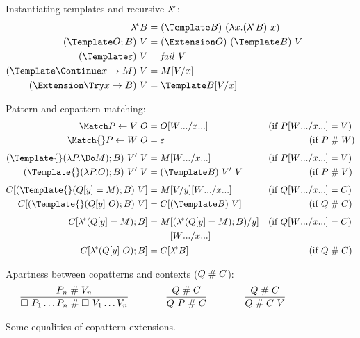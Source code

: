 \documentclass[runningheads]{llncs}
\begin{document}
\begin{figure}
Instantiating templates and recursive $\lambda^{\!*}$:
\begin{align*}
  \lamstar B
  &=
  (\Template B) ~ (\lambda x. (\lamstar B) ~ x)
  \\
  (\Template O; B) ~ V
  &=
  (\Extension O) ~ (\Template B) ~ V
  \\
  (\Template \varepsilon) ~ V
  &=
  \mathit{fail}~V
  \\
  (\Template \Continue x \to M) ~ V
  &=
  M\subst{x}{V}
  \\
  (\Extension \Try x \to B) ~ V
  &=
  \Template B\subst{x}{V}
\end{align*}

Pattern and copattern matching:
\begin{align*}
  \Match P \gets V ~ O
  &=
  O\subst{\many{x}}{\many{W}}
  &(\text{if } P\subst{\many{x}}{\many{W}} &= V)
  \\
  \Match{} P \gets W ~ O
  &=
  \varepsilon
  &(\text{if } P &\apart W)
  \\[1ex]
  (\Template{} (\lambda P. \Do M); B) ~ V' ~ V
  &=
  M\subst{\many{x}}{\many{W}}
  &(\text{if } P\subst{\many{x}}{\many{W}} &= V)
  \\
  (\Template{} (\lambda P. O); B) ~ V' ~ V
  &=
  (\Template B) ~ V' ~ V
  &(\text{if } P &\apart V)
  \\[1ex]
  C[(\Template{} (Q[y] = M); B) ~ V]
  &=
  M\subst{y}{V}\subst{\many{x}}{\many{W}}
  &(\text{if } Q\subst{\many{x}}{\many{W}} &= C)
  \\
  C[(\Template{} (Q[y] ~ O); B) ~ V]
  &=
  C[(\Template B) ~ V]
  &(\text{if } Q &\apart C)
  \\[1ex]
  C[\lamstar (Q[y] = M); B]
  &=
  \begin{aligned}[t]
    M
    &\subst{y}{(\lamstar (Q[y] = M); B)}
    \\
    &\subst{\many{x}}{\many{W}}
  \end{aligned}
  &(\text{if } Q\subst{\many{x}}{\many{W}} &= C)
  \\
  C[\lamstar (Q[y] ~ O); B]
  &=
  C[\lamstar B]
  &(\text{if } Q &\apart C)
\end{align*}

Apartness between copatterns and contexts ($Q \mathrel{\#} C$):
\begin{gather*}
  \infer
  {\hole ~ P_1 \dots P_n \apart \hole ~ V_1 \dots V_n}
  {P_n \apart V_n}
  \qqqquad
  \infer
  {Q ~ P \apart C}
  {Q \apart C}
  \qqqquad
  \infer
  {Q \apart C ~ V}
  {Q \apart C}
\end{gather*}

\caption{Some equalities of copattern extensions.}
\label{fig:source-equality}
\end{figure}
\end{document}
